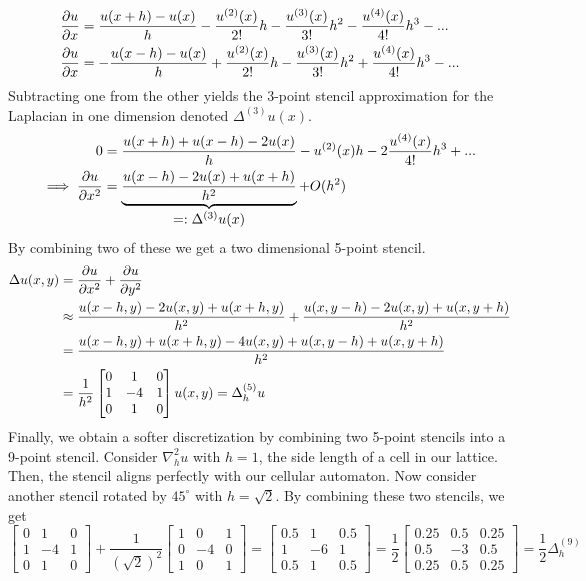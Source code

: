 \begin{align*}
  \pdv{u}{x} &= \frac{u(x+h) - u(x)}{h} - \frac{u^{(2)}(x)}{2!}h - \frac{u^{(3)}(x)}{3!}h^2 - \frac{u^{(4)}(x)}{4!}h^3 - ... \\
  \pdv{u}{x} &= - \frac{u(x-h) - u(x)}{h} + \frac{u^{(2)}(x)}{2!}h - \frac{u^{(3)}(x)}{3!}h^2 + \frac{u^{(4)}(x)}{4!}h^3 - ...
\end{align*}
Subtracting one from the other yields the 3-point stencil approximation for the Laplacian in one dimension denoted $\Delta^{(3)}u(x)$.
\begin{align*}
  0 &= \frac{u(x+h) + u(x-h) - 2u(x)}{h} - u^{(2)}(x)h - 2\frac{u^{(4)}(x)}{4!}h^3 + ...\\
  \implies \pdv{u}{x^2} &=  \underbrace{\frac{u(x-h) -2u(x) + u(x+h)}{h^2}}_{\let\scriptstyle\textstyle
  \substack{=: \Delta^{(3)}u(x)}} + O(h^2)
\end{align*}
By combining two of these we get a two dimensional 5-point stencil.
\begin{align*}
  \Delta u(x, y) &= \pdv{u}{x^2} + \pdv{u}{y^2}\\
                     &\approx \frac{u(x-h, y) -2u(x, y) + u(x+h, y)}{h^2} + \frac{u(x, y-h) -2u(x, y) + u(x, y+h)}{h^2}\\
                     &= \frac{u(x-h, y)+ u(x+h, y) -4u(x, y) + u(x, y-h) + u(x, y+h)}{h^2}\\
                     &= \frac{1}{h^2} \begin{bmatrix}
                                0 & 1 & 0\\
                                1 & -4 & 1\\
                                0 & 1 & 0
                     \end{bmatrix} u(x, y) = \Delta^{(5)}_h u
\end{align*}
Finally, we obtain a softer discretization by combining two 5-point stencils into a 9-point stencil. Consider $\nabla^2_h u$ with $h = 1$, the side length of a cell in our lattice. Then, the stencil aligns perfectly with our cellular automaton. Now consider another stencil rotated by $45^\circ$ with $h=\sqrt{2}$. By combining these two stencils, we get
\[
  \begin{bmatrix}
    0 & 1 & 0\\
    1 & -4 & 1\\
    0 & 1 & 0
  \end{bmatrix}
  + \frac{1}{(\sqrt{2})^2}
  \begin{bmatrix}
    1 & 0 & 1\\
    0 & -4 & 0\\
    1 & 0 & 1
  \end{bmatrix}
  = 
  \begin{bmatrix}
    0.5 & 1 & 0.5\\
    1 & -6 & 1\\
    0.5 & 1 & 0.5
  \end{bmatrix}
  = \frac{1}{2}
  \begin{bmatrix}
    0.25 & 0.5 & 0.25\\
    0.5 & -3 & 0.5\\
    0.25 & 0.5 & 0.25
  \end{bmatrix}
  = \frac{1}{2} \Delta^{(9)}_h 
\]
